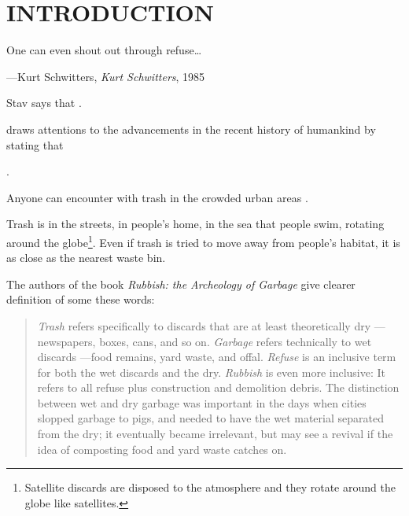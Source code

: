 \chapter{INTRODUCTION}



\begin{singlespace}
\epigraph{One can even shout out through refuse\ldots}{\hfill---Kurt Schwitters, \textit{Kurt Schwitters}, 1985}
\end{singlespace}



Stav says that  \citep[as cited in][]{navarro2015followingtrash}. 

\citet[11]{banash2013collage} draws attentions to the advancements in the recent history of humankind by stating that  

 \citep[ix]{pye2010trashculture}.

Anyone can encounter with trash in the crowded urban areas  \citep[16]{cerny1996recycled}.

Trash is in the streets, in people’s home, in the sea that people swim, rotating around the globe\footnote{Satellite discards are disposed to the atmosphere and they rotate around the globe like satellites.}. Even if trash is tried to move away from people’s habitat, it is as close as the nearest waste bin.

The authors of the book \textit{Rubbish: the Archeology of Garbage} give clearer definition of some these words:

\begin{quote}
\textit{Trash} refers specifically to discards that are at least theoretically dry ---newspapers, boxes, cans, and so on. \textit{Garbage} refers technically to wet discards ---food remains, yard waste, and offal. \textit{Refuse} is an inclusive term for both the wet discards and the dry. \textit{Rubbish} is even more inclusive: It refers to all refuse plus construction and demolition debris. The distinction between wet and dry garbage was important in the days when cities slopped garbage to pigs, and needed to have the wet material separated from the dry; it eventually became irrelevant, but may see a revival if the idea of composting food and yard waste catches on. \citep[9]{rathje1992rubbish}
\end{quote}
